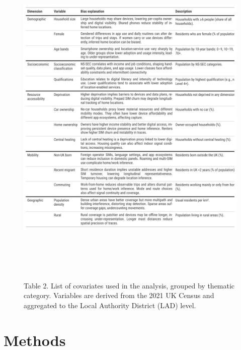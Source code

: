 \documentclass[]{rsos}%
\begin{document}
\begin{figure}
\centering
\includegraphics[width=5.20833in,height=6.66667in]{figures/01_table-variable-dictionary_explain.png}
\caption{Table 2. List of covariates used in the analysis, grouped by thematic
category. Variables are derived from the 2021 UK Census and aggregated
to the Local Authority District (LAD) level.}
\end{figure}

\section{Methods}\label{methods}
\end{document}
